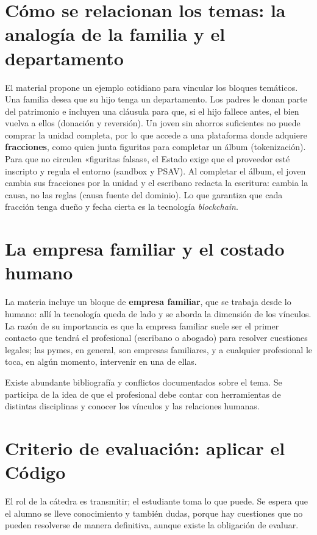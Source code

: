 \documentclass[12pt,oneside]{book}
\begin{document}
\section{Cómo se relacionan los temas: la analogía de la familia y el departamento}

El material propone un ejemplo cotidiano para vincular los bloques temáticos. Una familia desea que su hijo tenga un departamento. Los padres le donan parte del patrimonio e incluyen una cláusula para que, si el hijo fallece antes, el bien vuelva a ellos (donación y reversión). Un joven sin ahorros suficientes no puede comprar la unidad completa, por lo que accede a una plataforma donde adquiere \textbf{fracciones}, como quien junta figuritas para completar un álbum (tokenización). Para que no circulen «figuritas falsas», el Estado exige que el proveedor esté inscripto y regula el entorno (sandbox y PSAV). Al completar el álbum, el joven cambia sus fracciones por la unidad y el escribano redacta la escritura: cambia la causa, no las reglas (causa fuente del dominio). Lo que garantiza que cada fracción tenga dueño y fecha cierta es la tecnología \textit{blockchain}.

\section{La empresa familiar y el costado humano}

La materia incluye un bloque de \textbf{empresa familiar}, que se trabaja desde lo humano: allí la tecnología queda de lado y se aborda la dimensión de los vínculos. La razón de su importancia es que la empresa familiar suele ser el primer contacto que tendrá el profesional (escribano o abogado) para resolver cuestiones legales; las pymes, en general, son empresas familiares, y a cualquier profesional le toca, en algún momento, intervenir en una de ellas.

Existe abundante bibliografía y conflictos documentados sobre el tema. Se participa de la idea de que el profesional debe contar con herramientas de distintas disciplinas y conocer los vínculos y las relaciones humanas.

\section{Criterio de evaluación: aplicar el Código}

El rol de la cátedra es transmitir; el estudiante toma lo que puede. Se espera que el alumno se lleve conocimiento y también dudas, porque hay cuestiones que no pueden resolverse de manera definitiva, aunque existe la obligación de evaluar.
\end{document}
